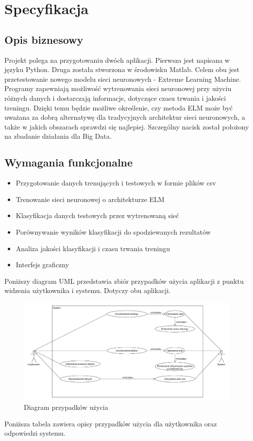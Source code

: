 \documentclass{article}
\begin{document}
\section{Specyfikacja}
\subsection{Opis biznesowy}
Projekt polega na przygotowaniu dwóch aplikacji. Pierwsza jest napisana w języku Python. Druga została stworzona w środowisku Matlab. Celem obu jest przetestowanie nowego modelu sieci neuronowych - Extreme Learning Machine. Programy zapewniają możliwość wytrenowania sieci neuronowej przy użyciu różnych danych i dostarczają informacje, dotyczące czasu trwania i jakości treningu. Dzięki temu będzie możliwe określenie, czy metoda ELM może być uważana za dobrą alternatywę dla tradycyjnych architektur sieci neuronowych, a także w jakich obszarach sprawdzi się najlepiej. Szczególny nacisk został położony na zbadanie działania dla Big Data.
\subsection{Wymagania funkcjonalne}
\begin{itemize}
\item Przygotowanie danych trenujących i testowych w formie plików csv
\item Trenowanie sieci neuronowej o architekturze ELM
\item Klasyfikacja danych testowych przez wytrenowaną sieć
\item Porównywanie wyników klasyfikacji do spodziewanych rezultatów
\item Analiza jakości klasyfikacji i  czasu trwania treningu
\item Interfejs graficzny
\end{itemize}
Poniższy diagram UML przedstawia zbiór przypadków użycia aplikacji z punktu widzenia użytkownika i systemu. Dotyczy obu aplikacji.
\begin{figure}[H]
\hspace*{-1.5cm}
\includegraphics[width=16cm]{use_case.png}
\caption{Diagram przypadków użycia}
\end{figure}
Poniższa tabela zawiera opisy przypadków użycia dla użytkownika oraz odpowiedzi systemu.
\end{document}
